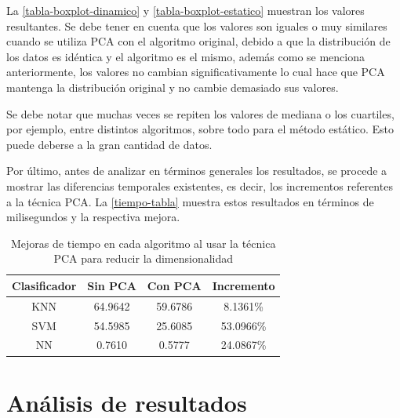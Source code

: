 La \ref{tabla-boxplot-dinamico} y \ref{tabla-boxplot-estatico} muestran los valores resultantes. Se debe tener en cuenta que los valores son iguales o muy similares cuando se utiliza PCA con el algoritmo original, debido a que la distribución de los datos es idéntica y el algoritmo es el mismo, además como se menciona anteriormente, los valores no cambian significativamente lo cual hace que PCA mantenga la distribución original y no cambie demasiado sus valores.

Se debe notar que muchas veces se repiten los valores de mediana o los cuartiles, por ejemplo, entre distintos algoritmos, sobre todo para el método estático. Esto puede deberse a la gran cantidad de datos.

Por último, antes de analizar en términos generales los resultados, se procede a mostrar las diferencias temporales existentes, es decir, los incrementos referentes a la técnica PCA. La \autoref{tiempo-tabla} muestra estos resultados en términos de milisegundos y la respectiva mejora.


\begin{table}[ht!]
\centering
\caption[Mejoras de tiempo en cada algoritmo]{Mejoras de tiempo en cada algoritmo al usar la técnica PCA para reducir la dimensionalidad}
\label{tiempo-tabla}
\begin{tabular}{|c|c|c|c|}
\hline
\textbf{Clasificador} & \textbf{Sin PCA} & \textbf{Con PCA} & \textbf{Incremento} \\ \hline
KNN                   & 64.9642          & 59.6786          & 8.1361\%            \\ \hline
SVM                   & 54.5985          & 25.6085          & 53.0966\%           \\ \hline
NN                    & 0.7610           & 0.5777           & 24.0867\%           \\ \hline
\end{tabular}
\end{table}



\section{Análisis de resultados}

